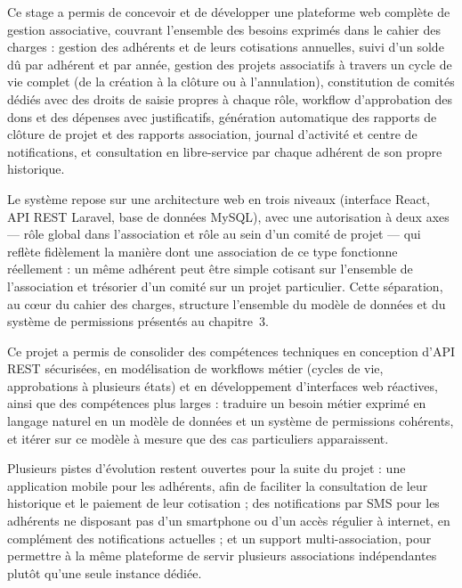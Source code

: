 
Ce stage a permis de concevoir et de développer une plateforme web complète
de gestion associative, couvrant l'ensemble des besoins exprimés dans le
cahier des charges : gestion des adhérents et de leurs cotisations annuelles,
suivi d'un solde dû par adhérent et par année, gestion des projets
associatifs à travers un cycle de vie complet (de la création à la clôture
ou à l'annulation), constitution de comités dédiés avec des droits de saisie
propres à chaque rôle, workflow d'approbation des dons et des dépenses avec
justificatifs, génération automatique des rapports de clôture de projet et
des rapports association, journal d'activité et centre de notifications, et
consultation en libre-service par chaque adhérent de son propre historique.

Le système repose sur une architecture web en trois niveaux (interface React,
API REST Laravel, base de données MySQL), avec une autorisation à deux axes
— rôle global dans l'association et rôle au sein d'un comité de projet — qui
reflète fidèlement la manière dont une association de ce type fonctionne
réellement : un même adhérent peut être simple cotisant sur l'ensemble de
l'association et trésorier d'un comité sur un projet particulier. Cette
séparation, au cœur du cahier des charges, structure l'ensemble du modèle de
données et du système de permissions présentés au chapitre~3.

Ce projet a permis de consolider des compétences techniques en conception
d'API REST sécurisées, en modélisation de workflows métier (cycles de vie,
approbations à plusieurs états) et en développement d'interfaces web
réactives, ainsi que des compétences plus larges : traduire un besoin
métier exprimé en langage naturel en un modèle de données et un système de
permissions cohérents, et itérer sur ce modèle à mesure que des cas
particuliers apparaissent.

Plusieurs pistes d'évolution restent ouvertes pour la suite du projet :
une application mobile pour les adhérents, afin de faciliter la consultation
de leur historique et le paiement de leur cotisation ; des notifications par
SMS pour les adhérents ne disposant pas d'un smartphone ou d'un accès
régulier à internet, en complément des notifications actuelles ; et un
support multi-association, pour permettre à la même plateforme de servir
plusieurs associations indépendantes plutôt qu'une seule instance dédiée.
